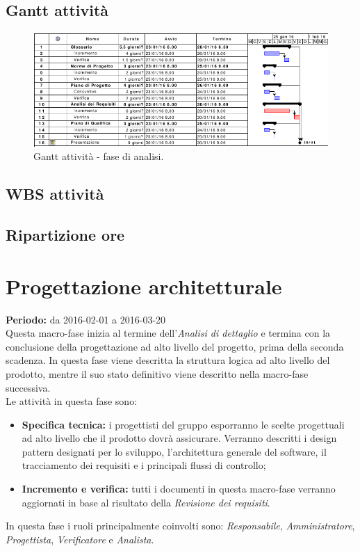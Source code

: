 \documentclass[a4paper]{report}
\begin{document}
			\subsection{Gantt attività}
				\begin{figure}[H]
					\centering
					\includegraphics[scale=0.5]{gantt-analisidettaglio}
					\caption{Gantt attività - fase di analisi.}
				\end{figure}
			\subsection{WBS attività}
			\subsection{Ripartizione ore}
		\section{Progettazione architetturale}
			\textbf{Periodo:} da 2016-02-01 a 2016-03-20 \\
			Questa macro-fase inizia al termine dell'\emph{Analisi di dettaglio} e termina con la conclusione 
			della progettazione ad alto livello del progetto, prima della seconda scadenza. In questa fase viene 
			descritta la struttura logica ad alto livello del prodotto, mentre il suo stato definitivo viene 
			descritto nella macro-fase successiva. \\
			Le attività in questa fase sono:
			\begin{itemize}
				\item \textbf{Specifica tecnica:} i progettisti del gruppo esporranno le scelte progettuali ad alto 
				livello che il prodotto dovrà assicurare. Verranno descritti i design pattern designati per lo sviluppo, 
				l'architettura generale del software, il tracciamento dei requisiti e i principali flussi di controllo;
				\item \textbf{Incremento e verifica:} tutti i documenti in questa macro-fase verranno aggiornati in base 
				al risultato della \emph{Revisione dei requisiti}.
			\end{itemize}
			In questa fase i ruoli principalmente coinvolti sono: \emph{Responsabile}, \emph{Amministratore},
			\emph{Progettista}, \emph{Verificatore} e  \emph{Analista}.
\end{document}
